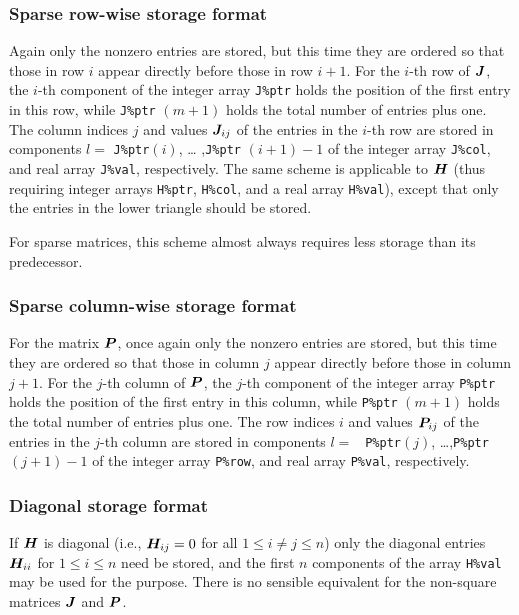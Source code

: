 \documentclass{galahad}
\begin{document}

\subsubsection{Sparse row-wise storage format}\label{rowwise}
Again only the nonzero entries are stored, but this time they are
ordered so that those in row $i$ appear directly before those in row
$i+1$. For the $i$-th row of ${\bm{J}}$, the $i$-th component of the integer
array {\tt J\%ptr} holds the position of the first entry in this row,
while {\tt J\%ptr} $(m+1)$ holds the total number of entries plus one.
The column indices $j$ and values ${\bm{J}}_{ij}$ of the entries in the
$i$-th row are stored in components $l =$ {\tt J\%ptr}$(i)$, \ldots
,{\tt J\%ptr} $(i+1)-1$ of the integer array {\tt J\%col}, and real
array {\tt J\%val}, respectively.
The same scheme is applicable to
${\bm{H}}$ (thus requiring integer arrays {\tt H\%ptr}, {\tt H\%col}, and
a real array {\tt H\%val}),
except that only the entries in the lower triangle should be stored.

For sparse matrices, this scheme almost always requires less storage than
its predecessor.

\subsubsection{Sparse column-wise storage format}\label{columnwise}
For the matrix ${\bm{P}}$, once again only the nonzero entries are
stored, but this time they are ordered so that those in column $j$ appear
directly before those in column $j+1$. For the $j$-th column of ${\bm{P}}$, the
$j$-th component of the integer array {\tt P\%ptr} holds the position of the
first entry in this column, while {\tt P\%ptr} $(m+1)$ holds the total number
of entries plus one.  The row indices $i$ and values ${\bm{P}}_{ij}$ of the
entries in the $j$-th column are stored in components $l =$ {\tt
  P\%ptr}$(j)$, \ldots ,{\tt P\%ptr} $(j+1)-1$ of the integer array
{\tt P\%row}, and real array {\tt P\%val}, respectively.

\subsubsection{Diagonal storage format}\label{diagonal}
If ${\bm{H}}$ is diagonal (i.e., ${\bm{H}}_{ij} = 0$ for all $1 \leq i \neq j \leq n$)
only the diagonal entries ${\bm{H}}_{ii}$ for $1 \leq i \leq n$ need be stored,
and the first $n$ components of the array {\tt H\%val} may be used for
the purpose. There is no sensible equivalent for the non-square
matrices ${\bm{J}}$ and ${\bm{P}}$.
\end{document}
